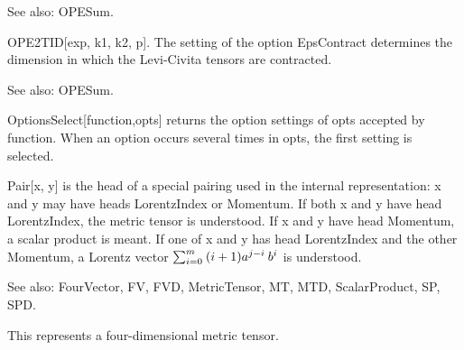 
See also:  OPESum.





OPE2TID[exp, k1, k2, p]. The setting of the option EpsContract determines the dimension in which the Levi-Civita tensors are contracted.



See also:  OPESum.





OptionsSelect[function,opts] returns the option settings of opts accepted by function. { }When an option occurs several times in opts,
  the first setting is selected.



Pair[x, y] is the head of a special pairing used in the internal representation: x and y may have heads LorentzIndex or Momentum. If both
  x and y have head LorentzIndex, the metric tensor is understood. If x and y have head Momentum, a scalar product is meant. If one of x
  and y has head LorentzIndex and the other Momentum, a Lorentz vector \(\sum _{i=0}^{m}\> (i+1){a^{j-i}}\> {b^i}\) is understood.

See also:  FourVector, FV, FVD, MetricTensor, MT, MTD, ScalarProduct, SP, SPD.


This represents a four-dimensional metric tensor.


